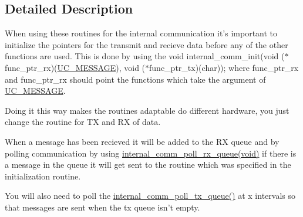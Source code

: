 \subsection{Detailed Description}
When using these routines for the internal communication it's important to initialize the pointers for the transmit and recieve data before any of the other functions are used. This is done by using the void internal\_\-comm\_\-init(void ($\ast$func\_\-ptr\_\-rx)(\hyperlink{structUC__MESSAGE}{UC\_\-MESSAGE}), void ($\ast$func\_\-ptr\_\-tx)(char)); where func\_\-ptr\_\-rx and func\_\-ptr\_\-rx should point the functions which take the argument of \hyperlink{structUC__MESSAGE}{UC\_\-MESSAGE}.

Doing it this way makes the routines adaptable do different hardware, you just change the routine for TX and RX of data.

When a message has been recieved it will be added to the RX queue and by polling communication by using \hyperlink{internal__comm_8h_64c4f318386e5cad700f6c5e08677c6f}{internal\_\-comm\_\-poll\_\-rx\_\-queue(void)} if there is a message in the queue it will get sent to the routine which was specified in the initialization routine.

You will also need to poll the \hyperlink{internal__comm_8c_35f8e503f80c8e1188ad09c1c0dde6ec}{internal\_\-comm\_\-poll\_\-tx\_\-queue()} at x intervals so that messages are sent when the tx queue isn't empty. 